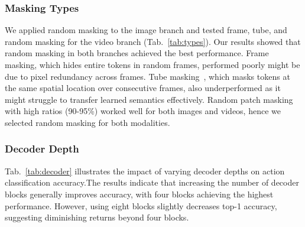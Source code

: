 \subsubsection{Masking Types} 
We applied random masking to the image branch and tested frame, tube, and random masking for the video branch (Tab.~\ref{tab:types}). Our results showed that random masking in both branches achieved the best performance. Frame masking, which hides entire tokens in random frames, performed poorly might be due to pixel redundancy across frames. Tube masking~\cite{tong2022videomae}, which masks tokens at the same spatial location over consecutive frames, also underperformed as it might struggle to transfer learned semantics effectively. Random patch masking~\cite{feichtenhofer2022masked} with high ratios (90-95\%) worked well for both images and videos, hence we selected random masking for both modalities.


\begin{table}[h!]
\centering
{}

\caption{Performance comparison of various masking strategies on the IN-1K SSv2 dataset using Acc@1, highlighting the impact of different combinations of image and video branches.}
\label{tab:types}

\end{table}

\subsubsection{Decoder Depth}Tab.~\ref{tab:decoder} illustrates the impact of varying decoder depths on action classification accuracy.The results indicate that increasing the number of decoder blocks generally improves accuracy, with four blocks achieving the highest performance. However, using eight blocks slightly decreases top-1 accuracy, suggesting diminishing returns beyond four blocks.


